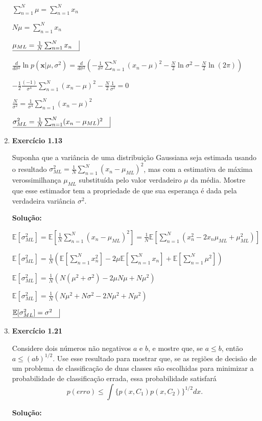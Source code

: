 \begin{enumerate}
    $\sum_{n=1}^{N}\mu = \sum_{n=1}^{N}x_n$
    
    $N\mu = \sum_{n=1}^{N}x_n$
    
    $ \underline{\mu_{ML} = \frac{1}{N} \sum_{n=1}^{N}x_n \quad} \vline $

    
    $\frac{d}{d\sigma^2}\ln p (\boldsymbol{x}|\mu, \sigma^2) = \frac{d}{d\sigma^2}\left( -\frac{1}{\sigma^2}\sum_{n=1}^{N}(x_n-\mu)^2-\frac{N}{2}\ln \sigma^2 - \frac{N}{2}\ln (2\pi) \right)$
    
    $-\frac{1}{2}\frac{(-1)}{\sigma^4} \sum_{n=1}^{N}(x_n-\mu)^2 - \frac{N}{2}\frac{1}{\sigma^2} = 0 $
    
    $ \frac{N}{\sigma^2}  = \frac{1}{\sigma^4} \sum_{n=1}^{N}(x_n-\mu)^2 $
    
    $ \underline{\sigma_{ML}^2 = \frac{1}{N} \sum_{n=1}^{N}(x_n - \mu_{ML})^2 \quad} \vline $

\item \textbf{Exercício 1.13} \par

Suponha que a variância de uma distribuição Gaussiana seja estimada usando o resultado $\sigma_{ML}^2=\frac{1}{N}\sum_{n=1}^{N}(x_n-\mu_{ML})^2$, mas com a estimativa de máxima verossimilhança $\mu_{ML}$ substituída pelo valor verdadeiro $\mu$ da média. Mostre que esse estimador tem a propriedade de que sua esperança é dada pela verdadeira variância $\sigma^2$.
\newline \par
\textbf{Solução:}


    $\mathbb{E}[\sigma_{ML}^2]=\mathbb{E}[\frac{1}{N}\sum_{n=1}^{N}(x_n-\mu_{ML})^2] = \frac{1}{N}\mathbb{E}[\sum_{n=1}^{N} \left( x_n^2 - 2 x_n \mu_{ML} + \mu_{ML}^2 \right) ]$
    
    $\mathbb{E}[\sigma_{ML}^2]=\frac{1}{N} \left(\mathbb{E}[\sum_{n=1}^{N}x_n^2]-2\mu\mathbb{E}[\sum_{n=1}^{N}x_n]+\mathbb{E}[\sum_{n=1}^{N} \mu^2]\right) $
    
    $\mathbb{E}[\sigma_{ML}^2]=\frac{1}{N} \left(  N(\mu^2+\sigma^2) -2\mu N \mu + N \mu^2 \right) $
    
    $\mathbb{E}[\sigma_{ML}^2]=\frac{1}{N} \left(  N\mu^2+N\sigma^2 - 2N \mu^2 + N \mu^2 \right) $

    $ \underline{\mathbb{E}[\sigma_{ML}^2] = \sigma^2 \quad} \vline $

\item \textbf{Exercício 1.21} \par

Considere dois números não negativos $a$ e $b$, e mostre que, se $a\leq b$, então $a \leq (ab)^{1/2}$. Use esse resultado para mostrar que, se as regiões de decisão de um problema de classificação de duas classes são escolhidas para minimizar a probabilidade de classificação errada, essa probabilidade satisfará
\begin{equation*}
    p(erro) \leq \int \{p(x,C_1)p(x,C_2)\}^{1/2}dx.
\end{equation*}
\newline \par
\textbf{Solução:}



\end{enumerate}
